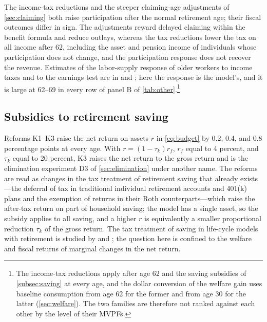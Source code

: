 The income-tax reductions and the steeper claiming-age adjustments of \autoref{sec:claiming} both raise participation after the normal retirement age; their fiscal outcomes differ in sign. The adjustments reward delayed claiming within the benefit formula and reduce outlays, whereas the tax reductions lower the tax on all income after 62, including the asset and pension income of individuals whose participation does not change, and the participation response does not recover the revenue. Estimates of the labor-supply response of older workers to income taxes and to the earnings test are in \citet{alpert2013estimating} and \citet{gelber2020employment}; here the response is the model's, and it is large at 62--69 in every row of panel B of \autoref{tab:other}.\footnote{The income-tax reductions apply after age 62 and the saving subsidies of \autoref{subsec:saving} at every age, and the dollar conversion of the welfare gain uses baseline consumption from age 62 for the former and from age 30 for the latter (\autoref{sec:welfare}). The two families are therefore not ranked against each other by the level of their MVPFs.} %

\subsection{Subsidies to retirement saving}\label{subsec:saving}

Reforms K1--K3 raise the net return on assets $r$ in \eqref{eq:budget} by 0.2, 0.4, and 0.8 percentage points at every age. %
With $r=(1-\tau_k)r_f$, $r_f$ equal to 4 percent, and $\tau_k$ equal to 20 percent, K3 raises the net return to the gross return and is the elimination experiment D3 of \autoref{sec:elimination} under another name. %
The reforms are read as changes in the tax treatment of retirement saving that already exists---the deferral of tax in traditional individual retirement accounts and 401(k) plans and the exemption of returns in their Roth counterparts---which raise the after-tax return on part of household saving; the model has a single asset, so the subsidy applies to all saving, and a higher $r$ is equivalently a smaller proportional reduction $\tau_k$ of the gross return. %
The tax treatment of saving in life-cycle models with retirement is studied by \citet{conesa2009taxing} and \citet{Paluszynski2023}; the question here is confined to the welfare and fiscal returns of marginal changes in the net return.

